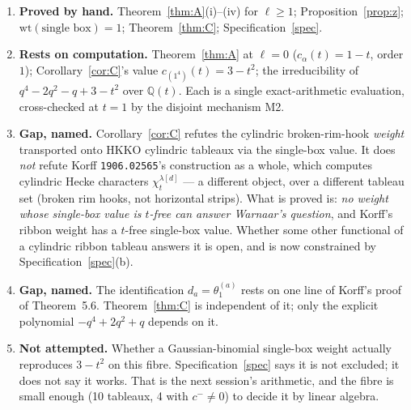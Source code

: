 \documentclass[11pt]{article}
\theoremstyle{definition}
\newcommand{\Q}{\mathbb{Q}}
\begin{document}
\begin{enumerate}
\item \textbf{Proved by hand.}  Theorem~\ref{thm:A}(i)--(iv) for $\ell\ge1$;
  Proposition~\ref{prop:z}; $\mathrm{wt}(\text{single box})=1$;
  Theorem~\ref{thm:C}; Specification~\ref{spec}.
\item \textbf{Rests on computation.}  Theorem~\ref{thm:A} at $\ell=0$
  ($c_\alpha(t)=1-t$, order $1$); Corollary~\ref{cor:C}'s value
  $c_{(1^4)}(t)=3-t^2$; the irreducibility of $q^4-2q^2-q+3-t^2$ over $\Q(t)$.  Each is
  a single exact-arithmetic evaluation, cross-checked at $t=1$ by the disjoint
  mechanism M2.
\item \textbf{Gap, named.}  Corollary~\ref{cor:C} refutes the cylindric broken-rim-hook
  \emph{weight} transported onto HKKO cylindric tableaux via the single-box value.  It
  does \emph{not} refute Korff \texttt{1906.02565}'s construction as a whole, which
  computes cylindric Hecke characters $\chi^{\lambda[d]}_t$ --- a different object, over
  a different tableau set (broken rim hooks, not horizontal strips).  What is proved is:
  \emph{no weight whose single-box value is $t$-free can answer Warnaar's question},
  and Korff's ribbon weight has a $t$-free single-box value.  Whether some other
  functional of a cylindric ribbon tableau answers it is open, and is now constrained by
  Specification~\ref{spec}(b).
\item \textbf{Gap, named.}  The identification $d_a=\theta^{(a)}_1$ rests on one line of
  Korff's proof of Theorem~5.6.  Theorem~\ref{thm:C} is independent of it; only the
  explicit polynomial $-q^4+2q^2+q$ depends on it.
\item \textbf{Not attempted.}  Whether a Gaussian-binomial single-box weight actually
  reproduces $3-t^2$ on this fibre.  Specification~\ref{spec} says it is not excluded;
  it does not say it works.  That is the next session's arithmetic, and the fibre is
  small enough (10 tableaux, 4 with $c^-\ne0$) to decide it by linear algebra.
\end{enumerate}
\end{document}
